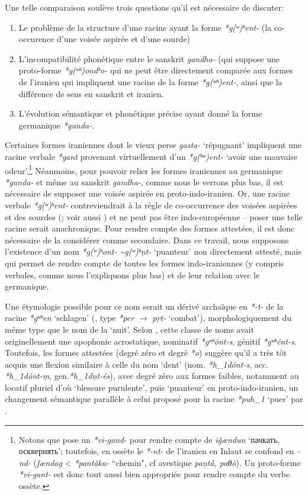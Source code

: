 \documentclass[11pt]{article}
\newcommand{\ipa}[1]{{\phon\textit{#1}}}
\newcommand{\forme}[1]{{\phon#1}}
\begin{document}
Une telle comparaison soulève trois questions qu'il est nécessaire de discuter: 

\begin{enumerate}
\item Le problème de la structure d'une  racine ayant la forme \ipa{*g(ʷ)ʰent-} (la co-occurence d'une voisée aspirée et d'une sourde)
\item L'incompatibilité phonétique entre le sanskrit \ipa{gandha-} (qui suppose une proto-forme \ipa{*g(ʷʰ)ondʰo-} qui ne peut être directement comparée aux formes de l'iranien qui impliquent une racine de la forme \ipa{*g(ʷʰ)ent-}, ainsi que la différence de sens en sanskrit et iranien.
\item L'évolution sémantique et phonétique précise ayant donné la forme germanique \ipa{*gunda-}.
\end{enumerate}

Certaines formes iraniennes dont le vieux perse \ipa{gasta-} `répugnant' impliquent une racine verbale \ipa{*gant} provenant virtuellement d'un \ipa{*g(ʰʷ)ent-} `avoir une mauvaise odeur'.\footnote{Notons que \citet[542]{abaev58vol1} pose un \ipa{*vi-gand-} pour rendre compte de \ipa{iǧændun} `\forme{пачкать, осквернять}'; toutefois, en ossète le \ipa{*-nt-} de l'iranien en Inlaut se confond en \ipa{-nd-} (\ipa{fændag} < \ipa{*pantâka-} ``chemin", cf avestique \ipa{paṇtā̊, paθō}). Un proto-forme \ipa{*vi-gant-} est donc tout aussi bien appropriée pour rendre compte du verbe ossète. } Néanmoins, pour pouvoir relier les formes iraniennes au germanique \ipa{*gunda-} et même au sanskrit \ipa{gandha-}, comme nous le verrons plus bas, il est nécessaire de supposer une voisée aspirée en proto-indo-iranien. Or, une racine verbale \ipa{*g(ʷ)ʰent-} contreviendrait à la règle de co-occurrence des voisées aspirées et des sourdes (\citealt{meillet1912zrazda}; voir aussi  \citealt{vaan99terdh}) et ne peut pas être indo-européenne -- poser une telle racine serait anachronique. Pour rendre compte des formes attestées, il est donc nécessaire de la considérer comme secondaire. Dans ce travail, nous supposons l'existence d'un nom \ipa{*g(ʷ)ʰont- \textasciitilde *g(ʷ)ʰṇt-} `puanteur' non directement attesté, mais qui permet de rendre compte de toutes les formes indo-iraniennes (y compris verbales, comme nous l'expliquons plus bas) et de leur relation avec le germanique.

Une étymologie possible pour ce nom serait un dérivé  archaïque en \ipa{*-t-} de la racine \ipa{*gʷʰen} `schlagen' (\citealt[218]{liv}, type \ipa{*per} $\rightarrow$ \ipa{pṛt-} `combat'), morphologiquement du même type que le nom de la `nuit'. Selon \citet{schindler67nekuz}, cette classe de noms avait originellement une apophonie acrostatique, nominatif \ipa{*gʷʰónt-s}, génitif \ipa{*gʷʰént-s}. Toutefois, les formes attestées (degré zéro et degré \ipa{*o}) suggère qu'il a très tôt acquis une flexion similaire à celle du nom `dent' (nom. \ipa{*h_1dónt-s}, acc. \ipa{*h_1dónt-ṃ}, gen.\ipa{*h_1dṇt-és}), avec degré zéro aux formes faibles, notamment au locatif pluriel d'où `blessure purulente', puis `puanteur' en proto-indo-iranien, un changement sémantique parallèle à celui proposé pour la racine \ipa{*puh_1} `puer' par \citet{garnier16secondary}.
 
\end{document}
